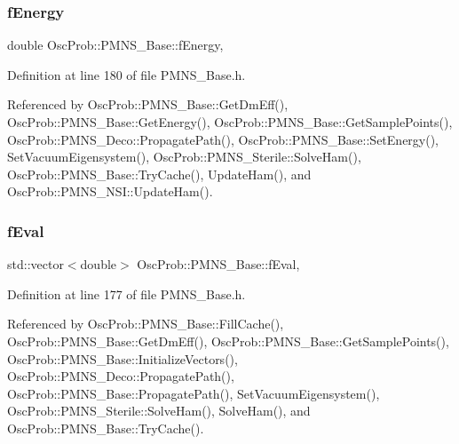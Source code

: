 \mbox{\label{classOscProb_1_1PMNS__Base_a2800af6d436972f3e900867790c046b0}} 
\subsubsection{\texorpdfstring{f\+Energy}{fEnergy}}
{\footnotesize\ttfamily double Osc\+Prob\+::\+P\+M\+N\+S\+\_\+\+Base\+::f\+Energy\hspace{0.3cm}{\ttfamily [protected]}, {\ttfamily [inherited]}}



Definition at line 180 of file P\+M\+N\+S\+\_\+\+Base.\+h.



Referenced by Osc\+Prob\+::\+P\+M\+N\+S\+\_\+\+Base\+::\+Get\+Dm\+Eff(), Osc\+Prob\+::\+P\+M\+N\+S\+\_\+\+Base\+::\+Get\+Energy(), Osc\+Prob\+::\+P\+M\+N\+S\+\_\+\+Base\+::\+Get\+Sample\+Points(), Osc\+Prob\+::\+P\+M\+N\+S\+\_\+\+Deco\+::\+Propagate\+Path(), Osc\+Prob\+::\+P\+M\+N\+S\+\_\+\+Base\+::\+Set\+Energy(), Set\+Vacuum\+Eigensystem(), Osc\+Prob\+::\+P\+M\+N\+S\+\_\+\+Sterile\+::\+Solve\+Ham(), Osc\+Prob\+::\+P\+M\+N\+S\+\_\+\+Base\+::\+Try\+Cache(), Update\+Ham(), and Osc\+Prob\+::\+P\+M\+N\+S\+\_\+\+N\+S\+I\+::\+Update\+Ham().

\mbox{\label{classOscProb_1_1PMNS__Base_a6319c34d7decbb9d7d6da279c06e8c2d}} 
\subsubsection{\texorpdfstring{f\+Eval}{fEval}}
{\footnotesize\ttfamily std\+::vector$<$double$>$ Osc\+Prob\+::\+P\+M\+N\+S\+\_\+\+Base\+::f\+Eval\hspace{0.3cm}{\ttfamily [protected]}, {\ttfamily [inherited]}}



Definition at line 177 of file P\+M\+N\+S\+\_\+\+Base.\+h.



Referenced by Osc\+Prob\+::\+P\+M\+N\+S\+\_\+\+Base\+::\+Fill\+Cache(), Osc\+Prob\+::\+P\+M\+N\+S\+\_\+\+Base\+::\+Get\+Dm\+Eff(), Osc\+Prob\+::\+P\+M\+N\+S\+\_\+\+Base\+::\+Get\+Sample\+Points(), Osc\+Prob\+::\+P\+M\+N\+S\+\_\+\+Base\+::\+Initialize\+Vectors(), Osc\+Prob\+::\+P\+M\+N\+S\+\_\+\+Deco\+::\+Propagate\+Path(), Osc\+Prob\+::\+P\+M\+N\+S\+\_\+\+Base\+::\+Propagate\+Path(), Set\+Vacuum\+Eigensystem(), Osc\+Prob\+::\+P\+M\+N\+S\+\_\+\+Sterile\+::\+Solve\+Ham(), Solve\+Ham(), and Osc\+Prob\+::\+P\+M\+N\+S\+\_\+\+Base\+::\+Try\+Cache().

